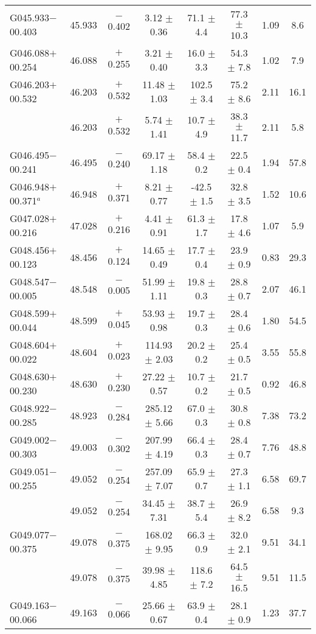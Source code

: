 \begin{ThreePartTable}
\begin{longtable}{lccccccc}
G045.933$-$00.403     &45.933&	$-$0.402	&3.12	$\pm$ 0.36	&71.1	$\pm$ 4.4	&77.3	$\pm$ 10.3	&1.09	&8.6\\
G046.088$+$00.254     &46.088&	$+$0.255	&3.21	$\pm$ 0.40	&16.0	$\pm$ 3.3	&54.3	$\pm$ 7.8	&1.02	&7.9\\
G046.203$+$00.532     &46.203&	$+$0.532	&11.48	$\pm$ 1.03	&102.5	$\pm$ 3.4	&75.2	$\pm$ 8.6	&2.11	&16.1\\
                      &46.203&	$+$0.532	&5.74	$\pm$ 1.41	&10.7	$\pm$ 4.9	&38.3	$\pm$ 11.7	&2.11	&5.8\\
G046.495$-$00.241     &46.495&	$-$0.240	&69.17	$\pm$ 1.18	&58.4	$\pm$ 0.2	&22.5	$\pm$ 0.4	&1.94	&57.8\\
G046.948$+$00.371$^a$ &46.948&	$+$0.371	&8.21	$\pm$ 0.77	&-42.5	$\pm$ 1.5	&32.8	$\pm$ 3.5	&1.52	&10.6\\
G047.028$+$00.216     &47.028&	$+$0.216	&4.41	$\pm$ 0.91	&61.3	$\pm$ 1.7	&17.8	$\pm$ 4.6	&1.07	&5.9\\
G048.456$+$00.123     &48.456&	$+$0.124	&14.65	$\pm$ 0.49	&17.7	$\pm$ 0.4	&23.9	$\pm$ 0.9	&0.83	&29.3\\
G048.547$-$00.005     &48.548&	$-$0.005	&51.99	$\pm$ 1.11	&19.8	$\pm$ 0.3	&28.8	$\pm$ 0.7	&2.07	&46.1\\
G048.599$+$00.044     &48.599&	$+$0.045	&53.93	$\pm$ 0.98	&19.7	$\pm$ 0.3	&28.4	$\pm$ 0.6	&1.80	&54.5\\
G048.604$+$00.022     &48.604&	$+$0.023	&114.93	$\pm$ 2.03	&20.2	$\pm$ 0.2	&25.4	$\pm$ 0.5	&3.55	&55.8\\
G048.630$+$00.230     &48.630&	$+$0.230	&27.22	$\pm$ 0.57	&10.7	$\pm$ 0.2	&21.7	$\pm$ 0.5	&0.92	&46.8\\
G048.922$-$00.285     &48.923&	$-$0.284	&285.12	$\pm$ 5.66	&67.0	$\pm$ 0.3	&30.8	$\pm$ 0.8	&7.38	&73.2\\
G049.002$-$00.303     &49.003&	$-$0.302	&207.99	$\pm$ 4.19	&66.4	$\pm$ 0.3	&28.4	$\pm$ 0.7	&7.76	&48.8\\
G049.051$-$00.255     &49.052&	$-$0.254	&257.09	$\pm$ 7.07	&65.9	$\pm$ 0.7	&27.3	$\pm$ 1.1	&6.58	&69.7\\
                      &49.052&	$-$0.254	&34.45	$\pm$ 7.31	&38.7	$\pm$ 5.4	&26.9	$\pm$ 8.2	&6.58	&9.3\\
G049.077$-$00.375     &49.078&	$-$0.375	&168.02	$\pm$ 9.95	&66.3	$\pm$ 0.9	&32.0	$\pm$ 2.1	&9.51	&34.1\\
                      &49.078&	$-$0.375	&39.98	$\pm$ 4.85	&118.6	$\pm$ 7.2	&64.5	$\pm$ 16.5	&9.51	&11.5\\
G049.163$-$00.066     &49.163&	$-$0.066	&25.66	$\pm$ 0.67	&63.9	$\pm$ 0.4	&28.1	$\pm$ 0.9	&1.23	&37.7\\

\end{longtable}
\end{ThreePartTable}
